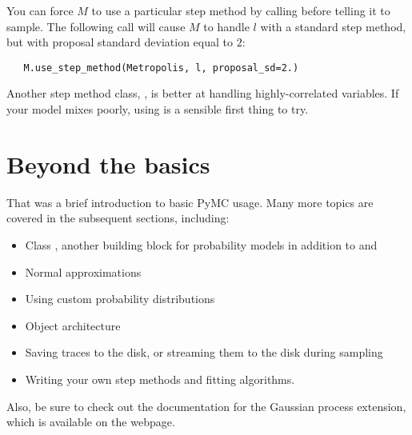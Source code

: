 You can force $M$ to use a particular step method by calling  before telling it to sample. The following call will cause $M$ to handle $l$ with a standard  step method, but with proposal standard deviation equal to $2$:
\begin{verbatim}
   M.use_step_method(Metropolis, l, proposal_sd=2.)
\end{verbatim}

Another step method class, , is better at handling highly-correlated variables. If your model mixes poorly, using  is a sensible first thing to try.

\section{Beyond the basics}
That was a brief introduction to basic PyMC usage. Many more topics are covered in the subsequent sections, including:
\begin{itemize}
   \item Class , another building block for probability models in addition to  and 
   \item Normal approximations
   \item Using custom probability distributions
   \item Object architecture
   \item Saving traces to the disk, or streaming them to the disk during sampling
   \item Writing your own step methods and fitting algorithms.
\end{itemize}
Also, be sure to check out the documentation for the Gaussian process extension, which is available on the webpage. 

